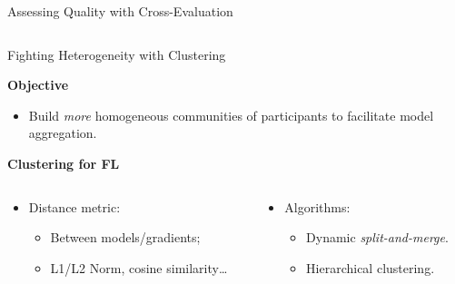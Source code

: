\begin{frame}{Assessing Quality with Cross-Evaluation}
\begin{columns}
\begin{column}{.55\textwidth}
    \end{column}

  \end{columns}

\end{frame}


% 
\begin{frame}{Fighting Heterogeneity with Clustering}
  
  \textbf{Objective}
  \begin{itemize}
    \item Build \emph{more} homogeneous communities of participants to facilitate model aggregation.
  \end{itemize}


    \pause
    \textbf{Clustering for FL}

    \begin{columns}
        
        \begin{column}{.5\textwidth}
            \begin{itemize}
                \item Distance metric:
                \begin{itemize}
                    \item Between models/gradients;
                    \item L1/L2 Norm, cosine similarity\dots~\cite{briggs_Federatedlearninghierarchical_2020}
                \end{itemize}
            \end{itemize}
        \end{column}
    
        \pause
        \begin{column}{.45\textwidth}
              \begin{itemize}
    
              \item Algorithms:
              \begin{itemize}
                \item Dynamic \emph{split-and-merge}.~\autocite{chen_ZeroKnowledgeClustering_2021}
                \item Hierarchical clustering.~\autocite{briggs_Federatedlearninghierarchical_2020}
              \end{itemize}
            \end{itemize}
    

\end{column}
\end{columns}
\end{frame}
